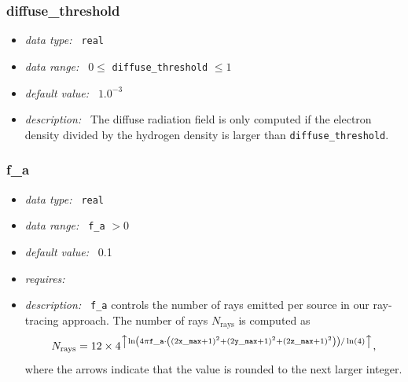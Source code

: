 \documentclass[a4paper,10pt]{article}
\begin{document}
\subsubsection{diffuse\_threshold}
\label{opt:diffussethreshold}
\begin{itemize}
 \item \textit{data type:~} \texttt{real}
 \item \textit{data range:~} $0 \leq$ \texttt{diffuse\_threshold} $\leq 1$ 
 \item \textit{default value:~} $1.0^{-3}$
 \item \textit{description:~} The diffuse radiation field is only computed if  
  the electron density divided by the hydrogen density is larger than 
  \texttt{diffuse\_threshold}.  
\end{itemize}


\subsubsection{f\_a}
\label{opt:fa}
\begin{itemize}
 \item \textit{data type:~} \texttt{real}
 \item \textit{data range:~}  \texttt{f\_a} $> 0$
 \item \textit{default value:~} 0.1
 \item \textit{requires:~}
 \item \textit{description:~} \texttt{f\_a} controls the number of rays emitted  
  per source in our ray-tracing approach. The number of  rays $N_\mathrm{rays}$ 
  is computed as
  \begin{equation}
  N_\mathrm{rays}=
  12 \times 4^{\left\uparrow \ln\left( 4 \pi \mathtt{f\_a} \cdot \left((2 
  \mathtt{x\_max} +1)^2+(2 \mathtt{y\_max} +1)^2+(2 \mathtt{z\_max}+1)^2 
  \right)\right)/\ln(4)\right\uparrow},
  \end{equation}
  where the arrows indicate that the value is rounded to the next larger 
  integer. 
\end{itemize}
\end{document}
